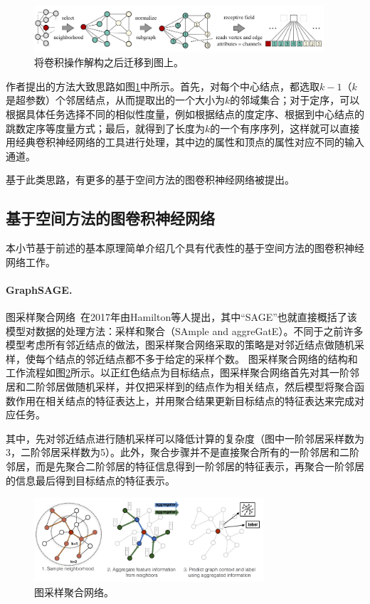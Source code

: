 \documentclass[final]{cvpr}
\newcommand{\mypara}[1]{\paragraph{#1.}}
\begin{document}
\begin{figure}[htb!]
    \centering
    \includegraphics[width=0.96\textwidth]{learn-conv-for-graph-2.png}
    \caption{将卷积操作解构之后迁移到图上。}
    \label{fig:learn-conv-for-graph-2}
\end{figure}

作者提出的方法大致思路如图\ref{fig:learn-conv-for-graph-2}中所示。首先，对每个中心结点，都选取$k-1$（$k$是超参数）个邻居结点，从而提取出的一个大小为$k$的邻域集合；对于定序，可以根据具体任务选择不同的相似性度量，例如根据结点的度定序、根据到中心结点的跳数定序等度量方式；最后，就得到了长度为$k$的一个有序序列，这样就可以直接用经典卷积神经网络的工具进行处理，其中边的属性和顶点的属性对应不同的输入通道。

基于此类思路，有更多的基于空间方法的图卷积神经网络被提出。


\subsection{基于空间方法的图卷积神经网络}
本小节基于前述的基本原理简单介绍几个具有代表性的基于空间方法的图卷积神经网络工作。

\mypara{GraphSAGE}
图采样聚合网络~\cite{hamilton2017inductive}在2017年由Hamilton等人提出，其中“SAGE”也就直接概括了该模型对数据的处理方法：采样和聚合（SAmple and aggreGatE）。不同于之前许多模型考虑所有邻近结点的做法，图采样聚合网络采取的策略是对邻近结点做随机采样，使每个结点的邻近结点都不多于给定的采样个数。
图采样聚合网络的结构和工作流程如图\ref{fig:graphSAGE}所示。以正红色结点为目标结点，图采样聚合网络首先对其一阶邻居和二阶邻居做随机采样，并仅把采样到的结点作为相关结点，然后模型将聚合函数作用在相关结点的特征表达上，并用聚合结果更新目标结点的特征表达来完成对应任务。

其中，先对邻近结点进行随机采样可以降低计算的复杂度（图中一阶邻居采样数为3，二阶邻居采样数为5）。此外，聚合步骤并不是直接聚合所有的一阶邻居和二阶邻居，而是先聚合二阶邻居的特征信息得到一阶邻居的特征表示，再聚合一阶邻居的信息最后得到目标结点的特征表示。


\begin{figure}[htb!]
    \centering
    \includegraphics[width=0.76\textwidth]{graphSAGE.png}
    \caption{图采样聚合网络。}
    \label{fig:graphSAGE}
\end{figure}
\end{document}
